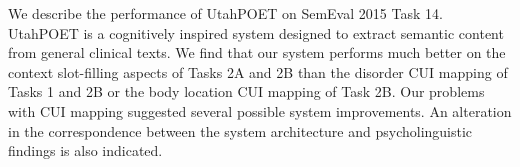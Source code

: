 We describe the performance of UtahPOET on SemEval 2015 Task 14. UtahPOET is a cognitively inspired system designed to extract semantic content from general clinical texts. We find that our system performs much better on the context slot-filling aspects of Tasks 2A and 2B than the disorder CUI mapping of Tasks 1 and 2B or the body location CUI mapping of Task 2B. Our problems with CUI mapping suggested several possible system improvements. An alteration in the correspondence between the system architecture and psycholinguistic findings is also indicated.
